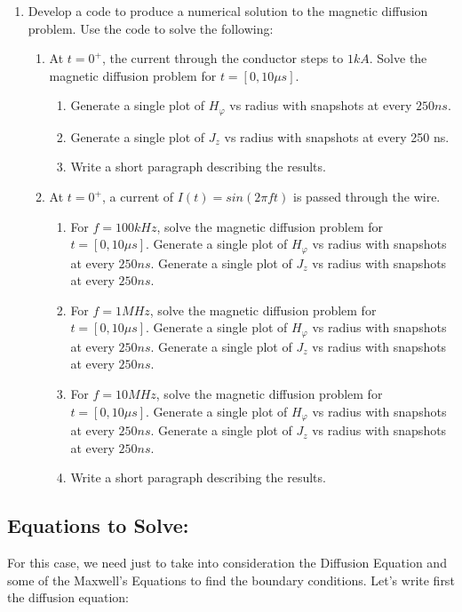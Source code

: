 \documentclass{article}
\begin{document}
\begin{enumerate}
\item Develop a code to produce a numerical solution to the magnetic diffusion problem. Use the code to solve the following:
\begin{enumerate}
\item At $t=0^+$, the current through the conductor steps to $1 kA$. Solve the magnetic diffusion problem for $t = [0,10 \mu s]$.
\begin{enumerate}
\item Generate a single plot of $H_\varphi$ vs radius with snapshots at every $250 ns$.
\item Generate a single plot of $J_z$ vs radius with snapshots at every 250 ns. 
\item Write a short paragraph describing the results. 
\end{enumerate}
\item  At $t=0^+$, a current of $I(t) = sin(2\pi f t)$ is passed through the wire.
\begin{enumerate}
\item For $f = 100kHz$, solve the magnetic diffusion problem for $t = [0,10\mu s]$. Generate a single plot of $H_\varphi$ vs radius with snapshots at every $250 ns$. Generate a single plot of $J_z$ vs radius with snapshots at every $250 ns$. 

\item For $f = 1MHz$, solve the magnetic diffusion problem for $t = [0,10\mu s]$. Generate a single plot of $H_\varphi$ vs radius with snapshots at every $250 ns$. Generate a single plot of $J_z$ vs radius with snapshots at every $250 ns$. 

\item For $f = 10MHz$, solve the magnetic diffusion problem for $t = [0,10\mu s]$. Generate a single plot of $H_\varphi$ vs radius with snapshots at every $250 ns$. Generate a single plot of $J_z$ vs radius with snapshots at every $250 ns$. 
\item Write a short paragraph describing the results. 
\end{enumerate}
\end{enumerate}
\end{enumerate}

\subsection{Equations to Solve:}

For this case, we need just to take into consideration the Diffusion Equation and some of the Maxwell's Equations to find the boundary conditions. Let's write first the diffusion equation:
\end{document}
